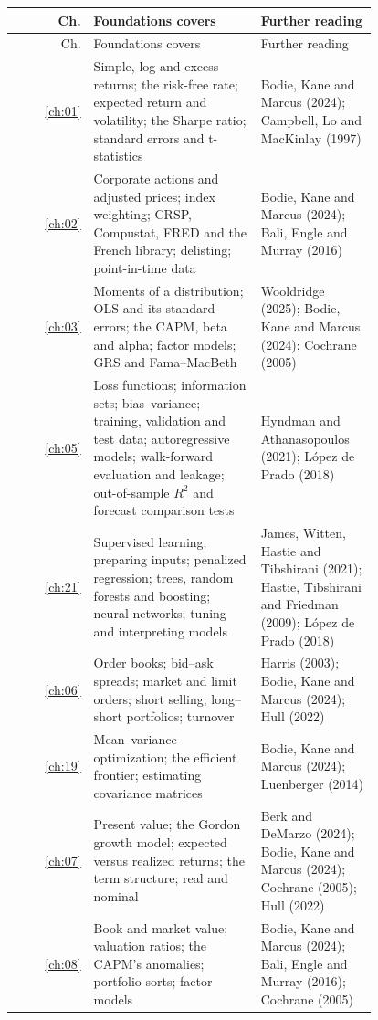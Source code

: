 \begingroup
\small
\setlength{\LTpre}{6pt}\setlength{\LTpost}{6pt}
\begin{longtable}{@{}r>{\raggedright\arraybackslash}p{0.468\linewidth}>{\raggedright\arraybackslash}p{0.324\linewidth}@{}}
\toprule
Ch. & Foundations covers & Further reading \\
\midrule
\endfirsthead
\toprule
Ch. & Foundations covers & Further reading \\
\midrule
\endhead
\bottomrule
\endlastfoot
\ref{ch:01} & Simple, log and excess returns; the risk-free rate; expected return and volatility; the Sharpe ratio; standard errors and t-statistics & Bodie, Kane and Marcus (2024); Campbell, Lo and MacKinlay (1997) \\
\ref{ch:02} & Corporate actions and adjusted prices; index weighting; CRSP, Compustat, FRED and the French library; delisting; point-in-time data & Bodie, Kane and Marcus (2024); Bali, Engle and Murray (2016) \\
\ref{ch:03} & Moments of a distribution; OLS and its standard errors; the CAPM, beta and alpha; factor models; GRS and Fama--MacBeth & Wooldridge (2025); Bodie, Kane and Marcus (2024); Cochrane (2005) \\
\ref{ch:05} & Loss functions; information sets; bias--variance; training, validation and test data; autoregressive models; walk-forward evaluation and leakage; out-of-sample $R^2$ and forecast comparison tests & Hyndman and Athanasopoulos (2021); L\'opez de Prado (2018) \\
\ref{ch:21} & Supervised learning; preparing inputs; penalized regression; trees, random forests and boosting; neural networks; tuning and interpreting models & James, Witten, Hastie and Tibshirani (2021); Hastie, Tibshirani and Friedman (2009); L\'opez de Prado (2018) \\
\ref{ch:06} & Order books; bid--ask spreads; market and limit orders; short selling; long--short portfolios; turnover & Harris (2003); Bodie, Kane and Marcus (2024); Hull (2022) \\
\ref{ch:19} & Mean--variance optimization; the efficient frontier; estimating covariance matrices & Bodie, Kane and Marcus (2024); Luenberger (2014) \\
\ref{ch:07} & Present value; the Gordon growth model; expected versus realized returns; the term structure; real and nominal & Berk and DeMarzo (2024); Bodie, Kane and Marcus (2024); Cochrane (2005); Hull (2022) \\
\ref{ch:08} & Book and market value; valuation ratios; the CAPM's anomalies; portfolio sorts; factor models & Bodie, Kane and Marcus (2024); Bali, Engle and Murray (2016); Cochrane (2005) \\

\end{longtable}
